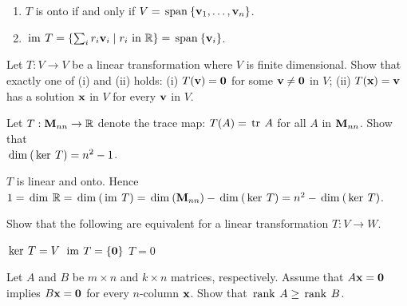 \begin{multicols}{2}
\begin{ex}
\begin{enumerate}[label={\alph*.}]
\item $T$ is onto if and only if $V = \thinspace\operatorname{span\medspace}\{\textbf{v}_{1}, \dots, \textbf{v}_{n}\}$.

\end{enumerate}
\begin{sol}
\begin{enumerate}[label={\alph*.}]
\setcounter{enumi}{1}
\item $\thinspace\operatorname{im \medspace}T = \left\lbrace \sum_{i} r_i\textbf{v}_i \mid r_i \mbox{ in } \mathbb{R} \right\rbrace = \thinspace\operatorname{span\medspace}\{\textbf{v}_i\}$.

\end{enumerate}
\end{sol}
\end{ex}

\begin{ex}
Let $T : V \to V$ be a linear transformation where $V$ is finite dimensional. Show that exactly one of (i) and (ii) holds: (i) $T(\textbf{v}) = \textbf{0}$ for some $\textbf{v} \neq \textbf{0}$ in $V$; (ii) $T(\textbf{x}) = \textbf{v}$ has a solution $\textbf{x}$ in $V$ for every $\textbf{v}$ in $V$.
\end{ex}

\begin{ex}
Let $T : \textbf{M}_{nn} \to \mathbb{R}$ denote the trace map: $T(A) = \thinspace\operatorname{tr \medspace}A$ for all $A$ in $\textbf{M}_{nn}$. Show that \\ $\thinspace\operatorname{dim\medspace}(\thinspace\operatorname{ker \medspace}T) = n^{2} - 1$.

\begin{sol}
$T$ is linear and onto. Hence $1 = \thinspace\operatorname{dim \medspace}\mathbb{R} = \thinspace\operatorname{dim\medspace}(\thinspace\operatorname{im \medspace}T) = \thinspace\operatorname{dim\medspace}(\textbf{M}_{nn}) - \thinspace\operatorname{dim\medspace}(\thinspace\operatorname{ker \medspace}T) = n^{2} - \thinspace\operatorname{dim\medspace}(\thinspace\operatorname{ker \medspace}T)$.
\end{sol}
\end{ex}

\begin{ex}
Show that the following are equivalent for a linear transformation $T : V \to W$.
\begin{exenumerate}
\exitem[1.] $\thinspace\operatorname{ker \medspace}T = V$
\exitem[2.] $\thinspace\operatorname{im \medspace}T = \{\textbf{0}\}$
\exitem[3.] $T = 0$
\end{exenumerate}
\end{ex}

\begin{ex}
Let $A$ and $B$ be $m \times n$ and $k \times n$ matrices, respectively. Assume that $A\textbf{x} = \textbf{0}$ implies $B\textbf{x} = \textbf{0}$ for every $n$-column $\textbf{x}$. Show that $\thinspace\operatorname{rank \medspace}A \geq \thinspace\operatorname{rank \medspace}B$. 


\end{ex}
\end{multicols}
